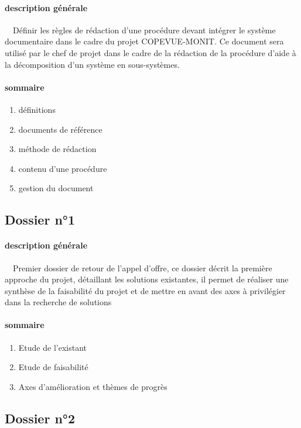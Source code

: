 \documentclass{mise_en_page}
\begin{document}
\paragraph[description générale]{description générale}
\ \ Définir les règles de rédaction d’une procédure devant intégrer le
système documentaire dans le cadre du projet COPEVUE-MONIT. Ce document
sera utilisé par le chef de projet dans le cadre de la rédaction de la
procédure d’aide à la décomposition d’un système en sous-systèmes.

\paragraph[sommaire]{sommaire}
\begin{enumerate}
\item définitions
\item documents de référence
\item méthode de rédaction
\item contenu d’une procédure
\item gestion du document
\end{enumerate}
\subsection[Dossier n°1]{Dossier n°1}
\paragraph[description générale]{description générale}
\ \ Premier dossier de retour de l’appel d’offre, ce dossier décrit la
première approche du projet, détaillant les solutions existantes, il
permet de réaliser une synthèse de la faisabilité du projet et de
mettre en avant des axes à privilégier dans la recherche de solutions

\paragraph[sommaire]{sommaire}
\begin{enumerate}
\item Etude de l’existant
\item Etude de faisabilité
\item Axes d’amélioration et thèmes de progrès
\end{enumerate}
\subsection[Dossier n°2]{Dossier n°2}
\end{document}

